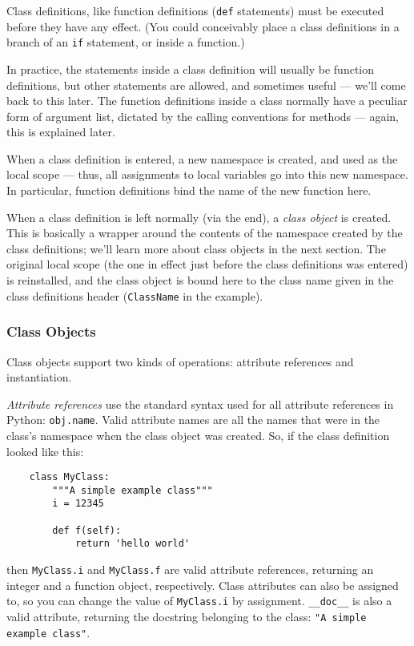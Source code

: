 \documentclass[UTF8]{article}
\begin{document}
Class definitions, like function definitions (\texttt{def} statements) must be executed before they
have any effect. (You could conceivably place a class definitions in a branch of an \texttt{if}
statement, or inside a function.)

In practice, the statements inside a class definition will usually be function definitions, but
other statements are allowed, and sometimes useful --- we'll come back to this later. The function
definitions inside a class normally have a peculiar form of argument list, dictated by the calling
conventions for methods --- again, this is explained later.

When a class definition is entered, a new namespace is created, and used as the local scope ---
thus, all assignments to local variables go into this new namespace. In particular, function
definitions bind the name of the new function here.

When a class definition is left normally (via the end), a \emph{class object} is created. This is
basically a wrapper around the contents of the namespace created by the class definitions; we'll
learn more about class objects in the next section. The original local scope (the one in effect
just before the class definitions was entered) is reinstalled, and the class object is bound here
to the class name given in the class definitions header (\texttt{ClassName} in the example).

\subsubsection{Class Objects}
Class objects support two kinds of operations: attribute references and instantiation.

\emph{Attribute references} use the standard syntax used for all attribute references in Python:
\texttt{obj.name}. Valid attribute names are all the names that were in the class's namespace when
the class object was created. So, if the class definition looked like this:
\begin{verbatim}
    class MyClass:
        """A simple example class"""
        i = 12345

        def f(self):
            return 'hello world'
\end{verbatim}
then \texttt{MyClass.i} and \texttt{MyClass.f} are valid attribute references, returning an integer
and a function object, respectively. Class attributes can also be assigned to, so you can change
the value of \texttt{MyClass.i} by assignment. \texttt{\_\_doc\_\_} is also a valid attribute,
returning the docstring belonging to the class: \texttt{"A simple example class"}.
\end{document}
